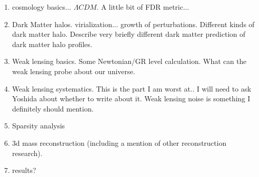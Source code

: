 \begin{enumerate}
\item cosmology basics... $\Lambda CDM$. A little bit of FDR metric...
\item Dark Matter halos. virialization... growth of perturbations. Different kinds of dark matter halo. Describe very briefly different dark matter prediction of dark matter halo profiles.
\item Weak lensing basics. Some Newtonian/GR level calculation. What can the weak lensing probe about our universe. 
\item Weak lensing systematics. This is the part I am worst at.. I will need to ask Yoshida about whether to write about it. Weak lensing noise is something I definitely should mention. 
\item Sparsity analysis
\item 3d mass reconstruction (including a mention of other reconstruction research). 
\item results? 

\end{enumerate}